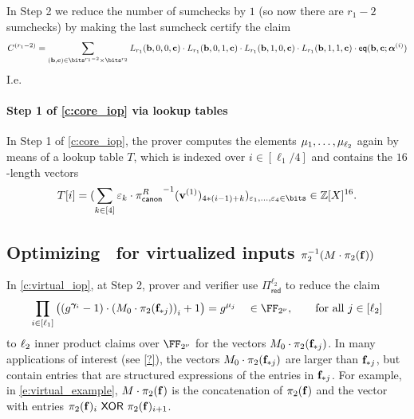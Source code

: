 \documentclass[11pt,letterpaper,usenames,dvipsnames]{article}
\begin{document}

In Step 2 we reduce the number of sumchecks by $1$ (so now there are $r_1-2$ sumchecks) by making the last sumcheck certify the claim
$$
C^{(r_1-2)}= \sum_{(\bb,\cc)\in \bits^{r_1-2}\times \bits^{r_2}} L_{r_1}(\bb,0,0,\cc) \cdot L_{r_1}(\bb,0,1,\cc)\cdot L_{r_1}(\bb,1,0,\cc)\cdot  L_{r_1}(\bb,1,1,\cc) \cdot \eq(\bb,\cc;\bm{\alpha}^{(i)})
$$
I.e.\ 

\paragraph{Step 1 of \cref{c:core_iop} via lookup tables} In Step 1 of \cref{c:core_iop}, the prover computes the elements $\mu_1,\ldots,\mu_{\ell_2}$ again by means of a lookup table $T$, which is indexed over  $i\in [\ell_1/4]$ and contains the $16$-length vectors $$T[i]= (\sum_{k\in [4]} \eps_k \cdot \picanon^{-1}(\vv^{(1)})_{4*(i-1) + k})_{\eps_1,\ldots, \eps_4 \in \bits} \in \ZZ[X]^{16}.$$



\renewcommand{\comfield}{\FF_{2^{\comfieldexp}}}


\subsection{Optimizing \ftwoz\ for virtualized inputs $\pi_2^{-1}(M\cdot \pi_2(\mathbf{f}))$}\label{s:opt_virtual}


In \cref{c:virtual_iop}, at Step 2, prover and verifier use $\Pi_{\mathsf{red}}^{\ell_2}$  to reduce the claim
%
\begin{equation}\label{e:grand_product_with_virtuals}
\prod_{i \in [\codedim_1]} \left(\left(g^{\bm{\gamma}_i}-1\right)\cdot \left(M_0\cdot \pi_2(\bff_{*j})\right)_i +1\right)= g^{\mu_j}  \quad  \in \comfield, \qquad \text{for all } j\in [\codedim_2]
\end{equation}
%
to $\ell_2$ inner product claims over $\comfield$ for the vectors $M_0\cdot \pi_2(\mathbf{f}_{*j})$. In many applications of interest (see \cref{?}), the vectors $M_0\cdot \pi_2(\mathbf{f}_{*j})$ are larger than $\mathbf{f}_{*j}$, but contain entries that are structured expressions of the entries in $\mathbf{f}_{*j}$. For example, in \cref{e:virtual_example}, $M\cdot \pi_2(\mathbf{f})$ is the concatenation of $\pi_2(\mathbf{f})$ and the vector with entries $\pi_2(\mathbf{f})_i \ \mathsf{XOR}\  \pi_2(\mathbf{f})_{i+1}$. 
\end{document}
